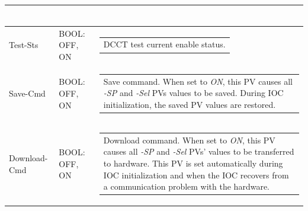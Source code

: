 \documentclass[openany]{article}
\begin{document}
\begin{longtable}{| m{3.0cm} m{4.5cm} m{7.0cm} |}
\begin{tabular}{@{}m{6cm}@{}}
						\end{tabular} \\ \hline
		Test-Sts & BOOL: OFF, ON & \begin{tabular}{@{}m{6cm}@{}}
 						DCCT test current enable status.
						\end{tabular} \\ \hline
		Save-Cmd & BOOL: OFF, ON & \begin{tabular}{@{}m{6cm}@{}}
 						Save command. When set to \emph{ON}, this PV causes all \emph{-SP} and \emph{-Sel} PVs values to be saved. During IOC initialization, the saved PV values are restored.
						\end{tabular} \\ \hline
		Download-Cmd & BOOL: OFF, ON & \begin{tabular}{@{}m{6cm}@{}}
 						Download command. When set to \emph{ON}, this PV causes all \emph{-SP} and \emph{-Sel} PVs' values to be transferred to hardware. This PV is set automatically during IOC initialization and when the IOC recovers from a communication problem with the hardware.
						\end{tabular} \\ \hline
	\end{longtable}
\end{document}

